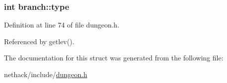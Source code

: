 \hypertarget{structbranch_ada8b57edb359f2fa43429fc63662b385}{
\subsubsection[{type}]{\setlength{\rightskip}{0pt plus 5cm}int branch\+::type}}\label{structbranch_ada8b57edb359f2fa43429fc63662b385}


Definition at line 74 of file dungeon.\+h.



Referenced by getlev().



The documentation for this struct was generated from the following file\+:\begin{DoxyCompactItemize}
\item 
nethack/include/\hyperlink{dungeon_8h}{dungeon.\+h}\end{DoxyCompactItemize}
